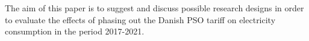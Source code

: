 The aim of this paper is to suggest and discuss possible research designs in order to evaluate the effects of phasing out the Danish PSO tariff on electricity consumption in the period 2017-2021.
 

